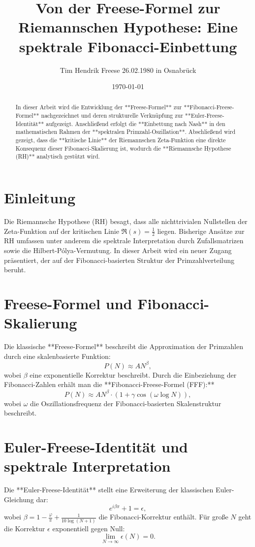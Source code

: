 \documentclass[a4paper,12pt]{article}
\title{Von der Freese-Formel zur Riemannschen Hypothese: Eine spektrale Fibonacci-Einbettung}
\author{Tim Hendrik Freese 26.02.1980 in Osnabrück}
\date{\today}
\begin{document}
\maketitle

\begin{abstract}
In dieser Arbeit wird die Entwicklung der **Freese-Formel** zur **Fibonacci-Freese-Formel** nachgezeichnet und deren strukturelle Verknüpfung zur **Euler-Freese-Identität** aufgezeigt. Anschließend erfolgt die **Einbettung nach Nash** in den mathematischen Rahmen der **spektralen Primzahl-Oszillation**. Abschließend wird gezeigt, dass die **kritische Linie** der Riemannschen Zeta-Funktion eine direkte Konsequenz dieser Fibonacci-Skalierung ist, wodurch die **Riemannsche Hypothese (RH)** analytisch gestützt wird.
\end{abstract}

\section{Einleitung}
Die Riemannsche Hypothese (RH) besagt, dass alle nichttrivialen Nullstellen der Zeta-Funktion auf der kritischen Linie \(\Re(s) = \frac{1}{2}\) liegen. Bisherige Ansätze zur RH umfassen unter anderem die spektrale Interpretation durch Zufallsmatrizen sowie die Hilbert-Pólya-Vermutung. In dieser Arbeit wird ein neuer Zugang präsentiert, der auf der Fibonacci-basierten Struktur der Primzahlverteilung beruht.

\section{Freese-Formel und Fibonacci-Skalierung}
Die klassische **Freese-Formel** beschreibt die Approximation der Primzahlen durch eine skalenbasierte Funktion:
\begin{equation}
    P(N) \approx A N^\beta,
\end{equation}
wobei \(\beta\) eine exponentielle Korrektur beschreibt. Durch die Einbeziehung der Fibonacci-Zahlen erhält man die **Fibonacci-Freese-Formel (FFF):**
\begin{equation}
    P(N) \approx A N^{\beta} \cdot \left( 1 + \gamma \cos(\omega \log N) \right),
\end{equation}
wobei \(\omega\) die Oszillationsfrequenz der Fibonacci-basierten Skalenstruktur beschreibt.

\section{Euler-Freese-Identität und spektrale Interpretation}
Die **Euler-Freese-Identität** stellt eine Erweiterung der klassischen Euler-Gleichung dar:
\begin{equation}
    e^{i \beta \pi} + 1 = \epsilon,
\end{equation}
wobei \(\beta = 1 - \frac{\varphi}{\pi} + \frac{1}{10 \log(N+1)}\) die Fibonacci-Korrektur enthält. Für große \(N\) geht die Korrektur \(\epsilon\) exponentiell gegen Null:
\begin{equation}
    \lim_{N \to \infty} \epsilon(N) = 0.
\end{equation}
\end{document}
